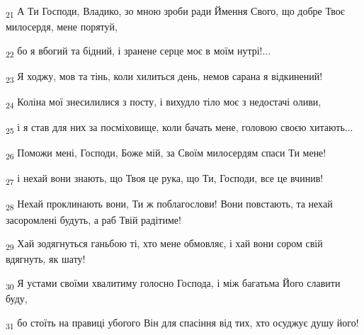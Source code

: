 \begin{tcolorbox}
\textsubscript{21} А Ти Господи, Владико, зо мною зроби ради Ймення Свого, що добре Твоє милосердя, мене порятуй,
\end{tcolorbox}
\begin{tcolorbox}
\textsubscript{22} бо я вбогий та бідний, і зранене серце моє в моїм нутрі!...
\end{tcolorbox}
\begin{tcolorbox}
\textsubscript{23} Я ходжу, мов та тінь, коли хилиться день, немов сарана я відкинений!
\end{tcolorbox}
\begin{tcolorbox}
\textsubscript{24} Коліна мої знесилилися з посту, і вихудло тіло моє з недостачі оливи,
\end{tcolorbox}
\begin{tcolorbox}
\textsubscript{25} і я став для них за посміховище, коли бачать мене, головою своєю хитають...
\end{tcolorbox}
\begin{tcolorbox}
\textsubscript{26} Поможи мені, Господи, Боже мій, за Своїм милосердям спаси Ти мене!
\end{tcolorbox}
\begin{tcolorbox}
\textsubscript{27} і нехай вони знають, що Твоя це рука, що Ти, Господи, все це вчинив!
\end{tcolorbox}
\begin{tcolorbox}
\textsubscript{28} Нехай проклинають вони, Ти ж поблагослови! Вони повстають, та нехай засоромлені будуть, а раб Твій радітиме!
\end{tcolorbox}
\begin{tcolorbox}
\textsubscript{29} Хай зодягнуться ганьбою ті, хто мене обмовляє, і хай вони сором свій вдягнуть, як шату!
\end{tcolorbox}
\begin{tcolorbox}
\textsubscript{30} Я устами своїми хвалитиму голосно Господа, і між багатьма Його славити буду,
\end{tcolorbox}
\begin{tcolorbox}
\textsubscript{31} бо стоїть на правиці убогого Він для спасіння від тих, хто осуджує душу його!
\end{tcolorbox}
